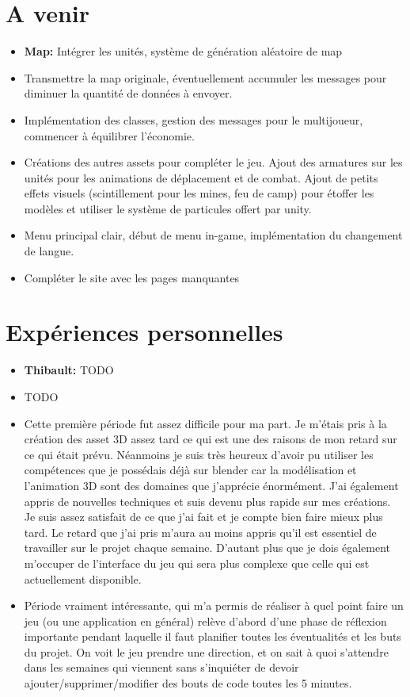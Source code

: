 \documentclass[12pt]{report}
\begin{document}
\chapter{A venir}

\begin{itemize}
\item \textbf{Map:} Intégrer les unités, système de génération aléatoire de map
\item {} Transmettre la map originale, éventuellement accumuler les messages pour diminuer la quantité de données à envoyer.
\item {} Implémentation des classes, gestion des messages pour le multijoueur, commencer à équilibrer l’économie.
\item {} Créations des autres assets pour compléter le jeu. Ajout des armatures sur les unités pour les animations de déplacement et de combat. Ajout de petits effets visuels (scintillement pour les mines, feu de camp) pour étoffer les modèles et utiliser le système de particules offert par unity.
\item {} Menu principal clair, début de menu in-game, implémentation du changement de langue.
\item {} Compléter le site avec les pages manquantes
\end{itemize}

\chapter{Expériences personnelles}

\begin{itemize}
\item \textbf{Thibault:} TODO
\item {} TODO
\item {} Cette première période fut assez difficile pour ma part. Je m’étais pris à la création des asset 3D assez tard ce qui est une des raisons de mon retard sur ce qui était prévu. Néanmoins je suis très heureux d’avoir pu utiliser les compétences que je possédais déjà sur blender car la modélisation et l’animation 3D sont des domaines que j’apprécie énormément. J’ai également appris de nouvelles techniques et suis devenu plus rapide sur mes créations. Je suis assez satisfait de ce que j’ai fait et je compte bien faire mieux plus tard. Le retard que j’ai pris m’aura au moins appris qu’il est essentiel de travailler sur le projet chaque semaine. D’autant plus que je dois également m’occuper de l’interface du jeu qui sera plus complexe que celle qui est actuellement disponible.
\item {} Période vraiment intéressante, qui m’a permis de réaliser à quel point faire un jeu (ou une application en général) relève d’abord d’une phase de réflexion importante pendant laquelle il faut planifier toutes les éventualités et les buts du projet. On voit le jeu prendre une direction, et on sait à quoi s’attendre dans les semaines qui viennent sans s’inquiéter de devoir ajouter/supprimer/modifier des bouts de code toutes les 5 minutes.
\end{itemize}
\end{document}

